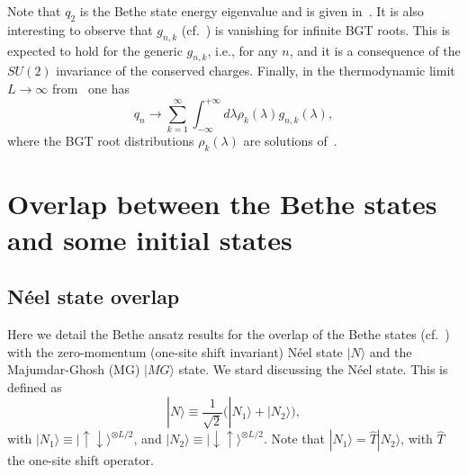 \documentclass[11pt]{iopart}
\begin{document}
%
Note that $q_2$ is the Bethe state energy eigenvalue and is given in~. 
It is also interesting to observe that $g_{n,k}$ (cf.~) is vanishing for 
infinite BGT roots. This is expected to hold for the generic $g_{n,k}$, i.e., for any 
$n$, and it is a consequence of the $SU(2)$ invariance of the conserved charges. Finally, 
in the thermodynamic limit $L\to\infty$ from~ one has 
%
\begin{equation}
\label{q0-th}
q_n\to\sum_{k=1}^\infty\int_{-\infty}^{+\infty}d\lambda\rho_k(\lambda)g_{n,k}(\lambda), 
\end{equation}
%
where the BGT root distributions $\rho_k(\lambda)$ are solutions of~. 



\section{Overlap between the Bethe states and some initial states} 
\label{sec:2}

\subsection{N\'eel state overlap}

Here we detail the Bethe ansatz results for the overlap of the Bethe states (cf.~) 
with the zero-momentum (one-site shift invariant) N\'eel state $|N\rangle$ and the 
Majumdar-Ghosh (MG) $|MG\rangle$ state. We stard discussing the N\'eel state. This is 
defined as 
%
\begin{equation}
\label{neel}
|N\rangle\equiv\frac{1}{\sqrt{2}}\big(|N_1\rangle
+|N_2\rangle\big), 
\end{equation}
%
with $|N_1\rangle\equiv |\uparrow\downarrow\rangle^{\otimes L/2}$, and $|N_2\rangle\equiv 
|\downarrow\uparrow\rangle^{\otimes L/2}$. Note that $|N_1\rangle=\hat T|N_2\rangle$, 
with $\hat T$ the one-site shift operator. 
\end{document}

